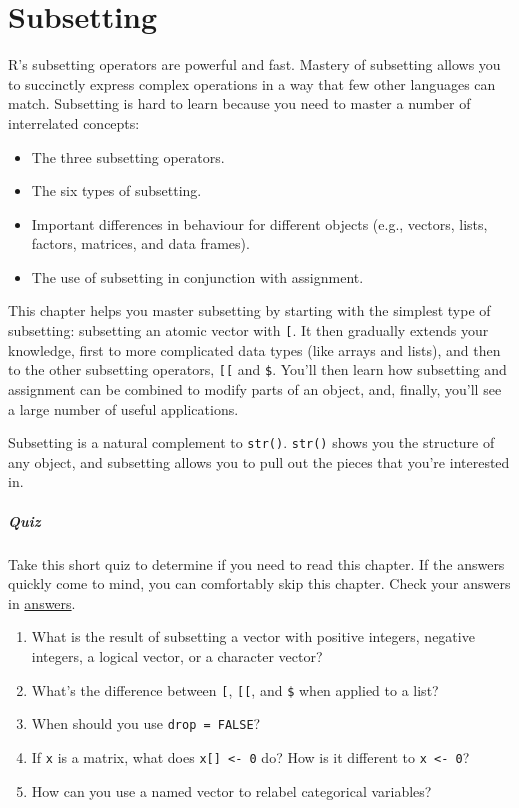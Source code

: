 \chapter{Subsetting}\label{subsetting}

R's subsetting operators are powerful and fast. Mastery of subsetting
allows you to succinctly express complex operations in a way that few
other languages can match. Subsetting is hard to learn because you need
to master a number of interrelated concepts:

\begin{itemize}
\item
  The three subsetting operators.
\item
  The six types of subsetting.
\item
  Important differences in behaviour for different objects (e.g.,
  vectors, lists, factors, matrices, and data frames).
\item
  The use of subsetting in conjunction with assignment.
\end{itemize}

This chapter helps you master subsetting by starting with the simplest
type of subsetting: subsetting an atomic vector with \texttt{{[}}. It
then gradually extends your knowledge, first to more complicated data
types (like arrays and lists), and then to the other subsetting
operators, \texttt{{[}{[}} and \texttt{\$}. You'll then learn how
subsetting and assignment can be combined to modify parts of an object,
and, finally, you'll see a large number of useful applications.

Subsetting is a natural complement to \texttt{str()}. \texttt{str()}
shows you the structure of any object, and subsetting allows you to pull
out the pieces that you're interested in. 

\paragraph{Quiz}

Take this short quiz to determine if you need to read this chapter. If
the answers quickly come to mind, you can comfortably skip this chapter.
Check your answers in \hyperref[subsetting-answers]{answers}.

\begin{enumerate}
\def\labelenumi{\arabic{enumi}.}
\item
  What is the result of subsetting a vector with positive integers,
  negative integers, a logical vector, or a character vector?
\item
  What's the difference between \texttt{{[}}, \texttt{{[}{[}}, and
  \texttt{\$} when applied to a list?
\item
  When should you use \texttt{drop = FALSE}?
\item
  If \texttt{x} is a matrix, what does \texttt{x{[}{]} \textless{}- 0}
  do? How is it different to \texttt{x \textless{}- 0}?
\item
  How can you use a named vector to relabel categorical variables?
\end{enumerate}


